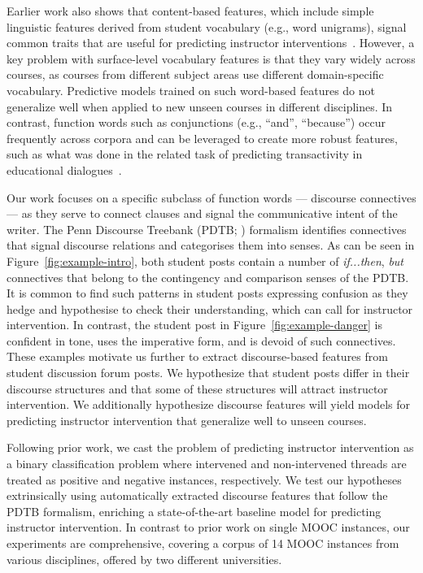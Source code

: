 \documentclass[letterpaper]{article}
\begin{document}
Earlier work also shows that content-based features, which
include simple linguistic features derived from student vocabulary 
(e.g., word unigrams), 
signal common traits that are useful for predicting instructor 
interventions~\cite{chandrasekaran2015learning,chaturvedi2014predicting}. 
However, a key problem with surface-level vocabulary features is that they 
vary widely across courses, as courses from different subject areas use 
different domain-specific vocabulary. Predictive models trained on such 
word-based 
features do not generalize well when applied to new unseen courses in different 
disciplines. In contrast, function words such as conjunctions (e.g., ``and'', 
``because'') occur frequently across corpora and can be leveraged to 
create more robust features, 
such as what was done in the related task of predicting transactivity in 
educational dialogues~\cite{joshi2007}.

Our work focuses on a specific subclass of 
function words --- discourse connectives --- as they serve to 
connect clauses and signal the communicative intent of the writer. 
The Penn Discourse Treebank (PDTB; \citeauthor{Prasad2008} 
\citeyear{Prasad2008}) formalism identifies connectives 
that signal discourse relations and categorises them into senses. 
As can be seen in Figure~\ref{fig:example-intro}, both student posts 
contain a number of \textit{if...then}, \textit{but} connectives that 
belong to the contingency and comparison senses of the PDTB. It is 
common to find such patterns in student posts 
expressing confusion as they hedge and hypothesise to check their understanding,
which can call for instructor intervention. In contrast, the student post in 
Figure~\ref{fig:example-danger} is confident in tone, uses the imperative form, 
and is devoid of such connectives. These examples motivate us further to extract 
discourse-based features from student discussion forum posts. We hypothesize 
that student posts differ in their discourse structures and that some of these 
structures will attract instructor intervention. We additionally hypothesize 
discourse features will yield models for predicting instructor intervention that 
generalize well to unseen courses. 

Following prior work, we cast the problem of predicting instructor intervention
as a binary classification problem where intervened and non-intervened threads 
are treated as positive and negative instances, respectively.
We test our hypotheses extrinsically using automatically extracted discourse 
features that follow the PDTB 
formalism, enriching a state-of-the-art baseline model for predicting
instructor intervention. In contrast to prior work on single MOOC
instances, our experiments are comprehensive, covering a corpus of 14
MOOC instances from various disciplines, offered by two different
universities.
\end{document}
